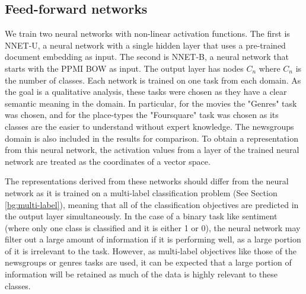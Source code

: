 




\subsection{Feed-forward networks}

We train two neural networks with non-linear activation functions. The first is NNET-U, a neural network with a single hidden layer that uses a pre-trained document embedding as input. The second is NNET-B, a neural network that starts with the PPMI BOW as input. The output layer has nodes $C_n$ where $C_n$ is the number of classes. Each network is trained on one task from each domain. As the goal is a qualitative analysis, these tasks were chosen as they have a clear semantic meaning in the domain. In particular, for the movies the "Genres" task was chosen, and for the place-types the "Foursquare" task was chosen as its classes are the easier to understand without expert knowledge. The newsgroups domain is also included in the results for comparison. To obtain a representation from this neural network, the activation values from a layer of the trained neural network are treated as the coordinates of a vector space.

The representations derived from these networks should differ from the  neural network as it is trained on a multi-label classification problem (See Section \ref{bg:multi-label}), meaning that all of the classification objectives are predicted in the output layer simultaneously. In the case of a binary task like sentiment (where only one class is classified and it is either 1 or 0),  the neural network may filter out a large amount of information if it is performing well, as a large portion of it is irrelevant to the task. However, as multi-label objectives like those of the newsgroups or genres tasks are used, it can be expected that a large portion of information will be retained as much of the data is highly relevant to these classes. 


